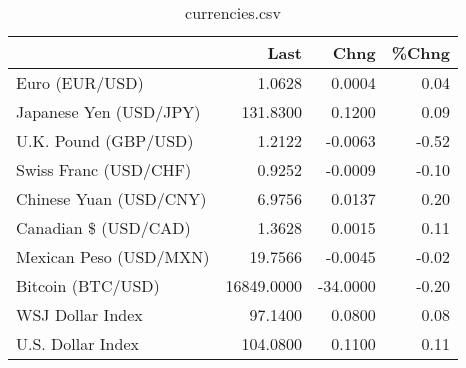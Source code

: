 \documentclass{article}%
\begin{document}
%


\begin{table}[htbp]%
\caption{currencies.csv}%
\centering%
\begin{adjustbox}{width=1\textwidth}%
\begin{tabular}{lrrr}
\toprule
                       &       Last &     Chng &  \%Chng \\
\midrule
        Euro (EUR/USD) &     1.0628 &   0.0004 &   0.04 \\
Japanese Yen (USD/JPY) &   131.8300 &   0.1200 &   0.09 \\
  U.K. Pound (GBP/USD) &     1.2122 &  -0.0063 &  -0.52 \\
 Swiss Franc (USD/CHF) &     0.9252 &  -0.0009 &  -0.10 \\
Chinese Yuan (USD/CNY) &     6.9756 &   0.0137 &   0.20 \\
  Canadian \$ (USD/CAD) &     1.3628 &   0.0015 &   0.11 \\
Mexican Peso (USD/MXN) &    19.7566 &  -0.0045 &  -0.02 \\
     Bitcoin (BTC/USD) & 16849.0000 & -34.0000 &  -0.20 \\
      WSJ Dollar Index &    97.1400 &   0.0800 &   0.08 \\
     U.S. Dollar Index &   104.0800 &   0.1100 &   0.11 \\
\bottomrule
\end{tabular}
%
\end{adjustbox}%
\end{table}

%
\end{document}

